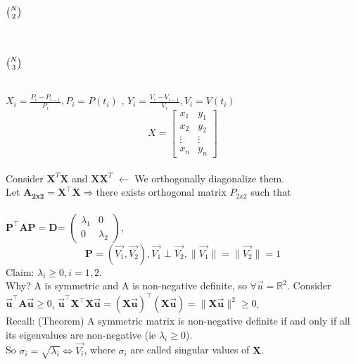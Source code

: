 \documentclass[11pt, oneside]{article}   	%
\begin{document}
${\Large N\choose 2}$\\
\\
\begin{figure}[htbp]

\end{figure}
\\
${\Large N\choose 3}$\\\\
\begin{Large}
$X_i=\frac{P_i -P_{i-1}}{P_i} ,  P_i=P(t_i)$ ,
$Y_i=\frac{V_i -V_{i-1}}{V_i},  V_i=V(t_i)$ \\

\[
   X=
  \left[ {\begin{array}{cc}
   x_1 & y_1 \\
   x_2&  y_2 \\
   \vdots &\vdots\\
   x_n & y_n
  \end{array} } \right]
\]\\
Consider  $\mathbf{X}^T\mathbf{X}$ and  $\mathbf{XX}^T$ $\leftarrow$  We orthogonally diagonalize them.\\
 
Let $\mathbf{A_{2x2}}=\mathbf{X}^\top\mathbf{X} \Rightarrow $there exists orthogonal matrix $P_{2x2}$ such that\\
\\
\hspace{40pt}$\mathbf{P}^\top\mathbf{A}\mathbf{P}=\mathbf{D}$=
$\begin{pmatrix}
\lambda_1 & 0\\
0 & \lambda_2    
\end{pmatrix}$,
\begin{equation}
\mathbf{P}=(\Vec{V_1}, \Vec{V_2}), \Vec{V_1}\perp\Vec{V_2},
\|\Vec{V_1}\|=\|\Vec{V_2}\|=1
\end{equation}
Claim: $\lambda_i \geq 0, i = 1, 2$.\\
Why? A is symmetric and A is non-negative definite, so $\forall \Vec{u} = \mathbb{R}^2$.
Consider $\mathbf{\vec{u}}^\top\mathbf{A}\mathbf{\Vec{u}}\geq0$, $\mathbf{\Vec{u}}^\top\mathbf{X}^\top\mathbf{X}\mathbf{\Vec{u}} = (\mathbf{X}\mathbf{\Vec{u}})^\top(\mathbf{X}\mathbf{\Vec{u}}) = \|\mathbf{X}\mathbf{\Vec{u}}\|^2 \geq 0$. \\
Recall: (Theorem) A symmetric matrix is non-negative definite if and only if all its eigenvalues are non-negative (ie $\lambda_i \geq 0$).\\
So $\sigma_i = \sqrt{\lambda_i}\Leftrightarrow\Vec{V_i}$, where $\sigma_i$ are called singular values of $\mathbf{X}$.



\end{Large}
\end{document}
